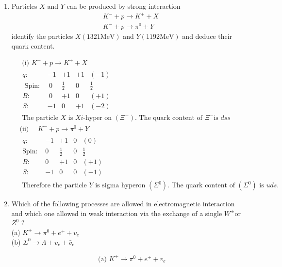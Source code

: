 \begin{enumerate}
	\item  Particles $X$ and $Y$ can be produced by strong interaction
	$$
	\begin{aligned}
	&K^{-}+p \rightarrow K^{+}+X \\
	&K^{-}+p \rightarrow \pi^0+Y
	\end{aligned}
	$$
	identify the particles $X(1321 \mathrm{MeV})$ and $Y(1192 \mathrm{MeV})$ and deduce their quark content.
		\begin{answer}
		\begin{align*}
		&\text { (i) } K^{-}+p \rightarrow K^{+}+X\\
		&\begin{array}{lllll}
q:&-1&+1&+1&(-1)\\
\text { Spin: } &\ 0&\frac{1}{2} & 0 & \frac{1}{2}\\
B: &\ 0 &+1 & 0 &(+1)\\
S:&-1 & 0 & +1 & (-2)
		\end{array}\\
	&\text{	The particle $X$ is $X i$-hyper on $\left(\Xi^{-}\right)$. The quark content of $\Xi^{-}$is $d s s$}\\
		&\text{(ii) $\quad K^{-}+p \rightarrow \pi^0+Y$}\\
		&\begin{array}{lllll}
	q:&-1 &+1 & 0 &(0)\\
	\text{Spin: }&0 & \frac{1}{2} & 0 & \frac{1}{2}\\
	B: &0 &+1 & 0 &(+1)\\
	S: & -1 & 0 & 0 & (-1)
		\end{array}\\
		&\text { Therefore the particle } Y \text { is sigma hyperon }\left(\Sigma^0\right) \text {. The quark content of }\left(\Sigma^0\right) \text { is } u d s \text {. }
		\end{align*}
	\end{answer}
	\item  Which of the following processes are allowed in electromagnetic interaction and which one allowed in weak interaction via the exchange of a single $W^{\pm}$or $Z^0$ ?\\
	(a) $K^{+} \rightarrow \pi^0+e^{+}+v_e$\\
	(b) $\Sigma^0 \rightarrow \Lambda+v_e+\bar{v}_e$
		\begin{answer}
		\begin{align*}
		&\text { (a) } K^{+} \rightarrow \pi^0+e^{+}+v_e\\

\end{align*}
\end{answer}
\end{enumerate}
